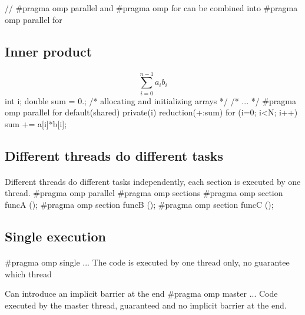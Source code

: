 \documentclass[%
twoside,                 %
final,                   %
10pt]{article}
\begin{document}
{\noindent
\bcppcod
// #pragma omp parallel and #pragma omp for
\ecppcod
can be combined into
\bcppcod
#pragma omp parallel for
\ecppcod



\subsection{Inner product}

\paragraph{}
\[
\sum_{i=0}^{n-1} a_ib_i
\]
\bcppcod
int i;
double sum = 0.;
/* allocating and initializing arrays */
/* ... */
#pragma omp parallel for default(shared) private(i) 
reduction(+:sum)
for (i=0; i<N; i++)
sum += a[i]*b[i];
}
\ecppcod



\subsection{Different threads do different tasks}

\paragraph{}

Different threads do different tasks independently, each section is executed by one thread.
\bcppcod
#pragma omp parallel
{
#pragma omp sections
{
#pragma omp section
funcA ();
#pragma omp section
funcB ();
#pragma omp section
funcC ();
}
}
\ecppcod



\subsection{Single execution}

\paragraph{}
\bcppcod
#pragma omp single { ... }
\ecppcod
The code is executed by one thread only, no guarantee which thread

Can introduce an implicit barrier at the end
\bcppcod
#pragma omp master { ... }
\ecppcod
Code executed by the master thread, guaranteed and no implicit barrier at the end.
\end{document}
